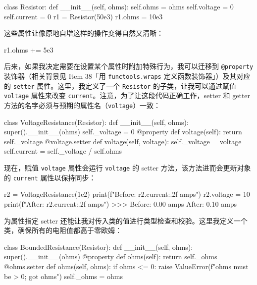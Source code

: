 \begin{codebox}[python]
class Resistor:
    def __init__(self, ohms):
        self.ohms = ohms
        self.voltage = 0
        self.current = 0
r1 = Resistor(50e3)
r1.ohms = 10e3
\end{codebox}

这些属性让像原地自增这样的操作变得自然又清晰：

\begin{codebox}[python]
r1.ohms += 5e3
\end{codebox}

后来，如果我决定需要在设置某个属性时附加特殊行为，我可以迁移到 \texttt{@property} 装饰器（相关背景见 Item 38「用 \texttt{functools.wraps} 定义函数装饰器」）及其对应的 \texttt{setter} 属性。这里，我定义了一个 \texttt{Resistor} 的子类，让我可以通过赋值 \texttt{voltage} 属性来改变 \texttt{current}。注意，为了让这段代码正确工作，setter 和 getter 方法的名字必须与预期的属性名（\texttt{voltage}）一致：

\begin{codebox}[python]
class VoltageResistance(Resistor):
    def __init__(self, ohms):
        super().__init__(ohms)
        self._voltage = 0
    @property
    def voltage(self):
        return self._voltage
    @voltage.setter
    def voltage(self, voltage):
        self._voltage = voltage
        self.current = self._voltage / self.ohms
\end{codebox}

现在，赋值 \texttt{voltage} 属性会运行 \texttt{voltage} 的 setter 方法，该方法进而会更新对象的 \texttt{current} 属性以保持同步：

\begin{codebox}[python]
r2 = VoltageResistance(1e2)
print(f"Before: {r2.current:.2f} amps")
r2.voltage = 10
print(f"After:  {r2.current:.2f} amps")
>>>
Before: 0.00 amps
After:  0.10 amps
\end{codebox}

为属性指定 setter 还能让我对传入类的值进行类型检查和校验。这里我定义一个类，确保所有的电阻值都高于零欧姆：

\begin{codebox}[python]
class BoundedResistance(Resistor):
    def __init__(self, ohms):
        super().__init__(ohms)
    @property
    def ohms(self):
        return self._ohms
    @ohms.setter
    def ohms(self, ohms):
        if ohms <= 0:
            raise ValueError(f"ohms must be > 0; got {ohms}")
        self._ohms = ohms
\end{codebox}

